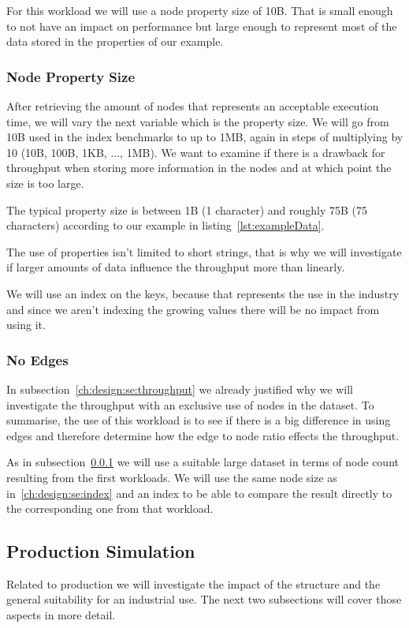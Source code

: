 For this workload we will use a node property size of 10B.
That is small enough to not have an impact on performance but large enough to represent most of the data stored in the properties of our example.

\subsubsection{Node Property Size}
\label{ch:design:se:nodePropertySize}
After retrieving the amount of nodes that represents an acceptable execution time,
we will vary the next variable which is the property size.
We will go from 10B used in the index benchmarks to up to 1MB,
again in steps of multiplying by 10 (10B, 100B, 1KB, ..., 1MB).
We want to examine if there is a drawback for throughput when storing more information in the nodes and at which point the size is too large.

The typical property size is between 1B (1 character) and roughly 75B (75 characters) according to our example in listing~\ref{lst:exampleData}.

The use of properties isn't limited to short strings,
that is why we will investigate if larger amounts of data influence the throughput more than linearly.

We will use an index on the keys,
because that represents the use in the industry and since we aren't indexing the growing values there will be no impact from using it.

\subsubsection{No Edges}
\label{ch:design:se:noEdges}
In subsection~\ref{ch:design:se:throughput} we already justified why we will investigate the throughput with an exclusive use of nodes in the dataset.
To summarise,
the use of this workload is to see if there is a big difference in using edges and therefore determine how the edge to node ratio effects the throughput.

As in subsection~\ref{ch:design:se:nodePropertySize} we will use a suitable large dataset in terms of node count resulting from the first workloads.
We will use the same node size as in~\ref{ch:design:se:index} and an index to be able to compare the result directly to the corresponding one from that workload.

\subsection{Production Simulation}
\label{ch:design:se:productionSimulation}
Related to production we will investigate the impact of the structure and the general suitability for an industrial use.
The next two subsections will cover those aspects in more detail.

